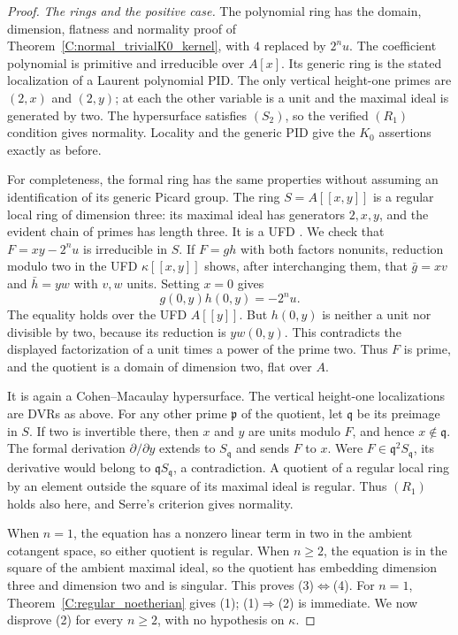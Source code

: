 \begin{proof}
\emph{The rings and the positive case.}
The polynomial ring has the domain, dimension, flatness and
normality proof of Theorem~\ref{C:normal_trivialK0_kernel},
with $4$ replaced by $2^nu$. The coefficient polynomial is
primitive and irreducible over $A[x]$. Its generic ring is
the stated localization of a Laurent polynomial PID.
The only vertical height-one primes are $(2,x)$ and $(2,y)$;
at each the other variable is a unit and the maximal ideal
is generated by two. The hypersurface satisfies $(S_2)$,
so the verified $(R_1)$ condition gives normality.
Locality and the generic PID give the $K_0$ assertions exactly
as before.

For completeness, the formal ring has the same properties
without assuming an identification of its generic Picard group.
The ring $S=A[[x,y]]$ is a regular local ring of dimension three:
its maximal ideal has generators $2,x,y$, and the evident chain
of primes has length three. It is a UFD
\cite[Lemma 15.123.2, Tag 0AG0]{C-NormalNodesStacks}.
We check that $F=xy-2^nu$ is irreducible in $S$.
If $F=gh$ with both factors nonunits, reduction modulo two
in the UFD $\kappa[[x,y]]$ shows, after interchanging them,
that $\bar g=xv$ and $\bar h=yw$ with $v,w$ units.
Setting $x=0$ gives
\[
                  g(0,y)h(0,y)=-2^nu.
\]
The equality holds over the UFD $A[[y]]$. But $h(0,y)$ is neither a unit nor
divisible by two, because its reduction is $yw(0,y)$.
This contradicts the displayed factorization of a unit times
a power of the prime two. Thus $F$ is prime, and the quotient
is a domain of dimension two, flat over $A$.

It is again a Cohen--Macaulay hypersurface. The vertical
height-one localizations are DVRs as above. For any other
prime $\mathfrak p$ of the quotient, let $\mathfrak q$ be its
preimage in $S$. If two is invertible there, then $x$ and $y$
are units modulo $F$, and hence $x\notin\mathfrak q$.
The formal derivation $\partial/\partial y$ extends to
$S_{\mathfrak q}$ and sends $F$ to $x$.
Were $F\in\mathfrak q^2S_{\mathfrak q}$, its derivative
would belong to $\mathfrak qS_{\mathfrak q}$, a contradiction.
A quotient of a regular local ring by an element outside
the square of its maximal ideal is regular. Thus $(R_1)$
holds also here, and Serre's criterion gives normality.

When $n=1$, the equation has a nonzero linear term in two
in the ambient cotangent space, so either quotient is regular.
When $n\ge2$, the equation is in the square of the ambient
maximal ideal, so the quotient has embedding dimension three
and dimension two and is singular. This proves (3)$\Leftrightarrow$(4).
For $n=1$, Theorem~\ref{C:regular_noetherian} gives (1);
(1)$\Rightarrow$(2) is immediate. We now disprove (2) for
every $n\ge2$, with no hypothesis on $\kappa$.


\end{proof}
